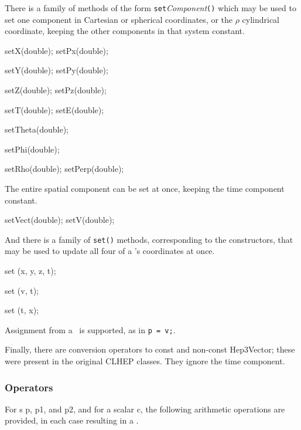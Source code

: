 \noindent
There is a family of methods of the form
{\tt set}{\it Component}{\tt ()} which may be used to set 
one component in Cartesian or spherical coordinates, or the $\rho$
cylindrical coordinate,
keeping the other components in that system constant.  
\begin{shortlist}
  \item setX(double);  \/\/\/ setPx(double);  
  \item setY(double);  \/\/\/ setPy(double);  
  \item setZ(double);  \/\/\/ setPz(double);  
  \item setT(double);  \/\/\/ setE(double);  
  \item setTheta(double); \see{\ref{eq:polar}}
  \item setPhi(double);   \see{\ref{eq:polar}}
  \item setRho(double); \/\/\/  setPerp(double); 
						\see{\ref{eq:cylindrical}}
\end{shortlist}

The entire spatial component can be set at once, keeping the time component 
constant.

\begin{shortlist}
  \item setVect(double);  \/\/\/ setV(double);  
\end{shortlist}

\noindent
And there is a family of {\tt set()} methods, corresponding to the 
constructors,
that may be used to update all four of a \LV 's coordinates at once.
\begin{shortlist}
  \item set (x, y, z, t);
  \item set (v, t);
  \item set (t, x);
\end{shortlist}

\noindent
Assignment from a \SV\ is supported, as in \verb|p = v;|.

\noindent
Finally, there are conversion operators to const and non-const Hep3Vector;
these were present in the original CLHEP classes.  
They ignore the time component.

\subsubsection{Operators}

For \LV s p, p1, and p2, and for a scalar c,
the following arithmetic operations are provided,
in each case resulting in a \LV .

